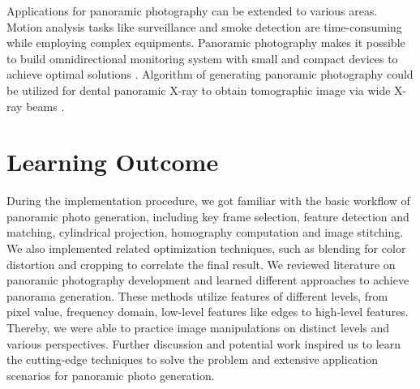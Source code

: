 \documentclass[runningheads]{llncs}
\begin{document}
Applications for panoramic photography can be extended to various areas. Motion analysis tasks like surveillance and smoke detection are time-consuming while employing complex equipments. Panoramic photography makes it possible to build omnidirectional monitoring system with small and compact devices to achieve optimal solutions \cite{kopilovic2000application}. Algorithm of generating panoramic photography could be utilized for dental panoramic X-ray to obtain tomographic image via wide X-ray beams \cite{arai1998dental}.


\section{Learning Outcome}

During the implementation procedure, we got familiar with the basic workflow of panoramic photo generation, including key frame selection, feature detection and matching, cylindrical projection, homography computation and image stitching. We also implemented related optimization techniques, such as blending for color distortion and cropping to correlate the final result. We reviewed literature on panoramic photography development and learned different approaches to achieve panorama generation. These methods utilize features of different levels, from pixel value, frequency domain, low-level features like edges to high-level features. Thereby, we were able to practice image manipulations on distinct levels and various perspectives. Further discussion and potential work inspired us to learn the cutting-edge techniques to solve the problem and extensive application scenarios for panoramic photo generation.




\end{document}
